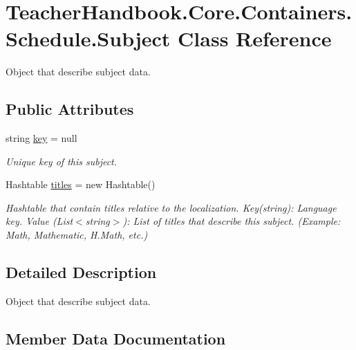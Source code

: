 \hypertarget{class_teacher_handbook_1_1_core_1_1_containers_1_1_schedule_1_1_subject}{}\section{Teacher\+Handbook.\+Core.\+Containers.\+Schedule.\+Subject Class Reference}
\label{class_teacher_handbook_1_1_core_1_1_containers_1_1_schedule_1_1_subject}


Object that describe subject data.  


\subsection*{Public Attributes}
\begin{DoxyCompactItemize}
\item 
string \mbox{\hyperlink{class_teacher_handbook_1_1_core_1_1_containers_1_1_schedule_1_1_subject_a464bb371a4d6eb0eb9bd0e0e096a5434}{key}} = null
\begin{DoxyCompactList}\small\item\em Unique key of this subject. \end{DoxyCompactList}\item 
Hashtable \mbox{\hyperlink{class_teacher_handbook_1_1_core_1_1_containers_1_1_schedule_1_1_subject_ac024684f42182cdbcf4ae477395f92a1}{titles}} = new Hashtable()
\begin{DoxyCompactList}\small\item\em Hashtable that contain titles relative to the localization. Key(string)\+: Language key. Value (List$<$string$>$)\+: List of titles that describe this subject. (Example\+: Math, Mathematic, H.\+Math, etc.) \end{DoxyCompactList}\end{DoxyCompactItemize}


\subsection{Detailed Description}
Object that describe subject data. 



\subsection{Member Data Documentation}
\mbox{\label{class_teacher_handbook_1_1_core_1_1_containers_1_1_schedule_1_1_subject_a464bb371a4d6eb0eb9bd0e0e096a5434}} 
